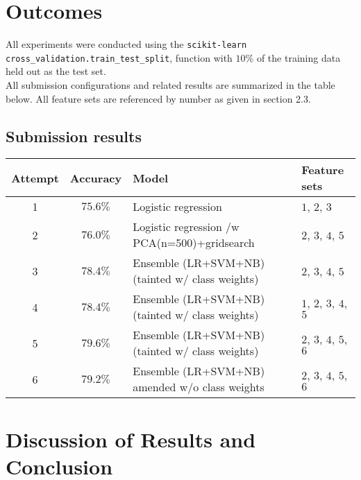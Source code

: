 \documentclass[
10pt, %
a4paper, %
oneside, %
headinclude,footinclude, %
BCOR5mm, %
]{scrartcl}
\begin{document}

\section{Outcomes}

All experiments were conducted using the \texttt{scikit-learn} 
\texttt{cross\_validation.train\_test\_split}, function with $10\%$ of
the training data held out as the test set. \\

\noindent All submission configurations and related results are 
summarized in the table below. All feature sets are referenced by number as 
given in section 2.3.

\subsection{Submission results}
\begin{center}
    \begin{tabular}{| c | c | l | l|}
    \hline
    Attempt & Accuracy & Model               & Feature sets    \\ \hline
    1       & $75.6\%$ & Logistic regression  & $1$, $2$, $3$  \\ \hline
    2       & $76.0\%$ & Logistic regression /w PCA(n=500)+gridsearch &  $2$, $3$, $4$, $5$ \\ \hline
    3       & $78.4\%$ & Ensemble (LR+SVM+NB) (tainted w/ class weights) &$2$, $3$, $4$, $5$       \\ \hline
    4       & $78.4\%$ & Ensemble (LR+SVM+NB) (tainted w/ class weights) & $1$, $2$, $3$, $4$, $5$ \\ \hline
    5       & $79.6\%$ & Ensemble (LR+SVM+NB) (tainted w/ class weights) & $2$, $3$, $4$, $5$, $6$ \\ \hline
    6       & $79.2\%$ & Ensemble (LR+SVM+NB) amended w/o class weights & $2$, $3$, $4$, $5$, $6$ \\ \hline
    \end{tabular}
\end{center}

\section{Discussion of Results and Conclusion}
\end{document}

